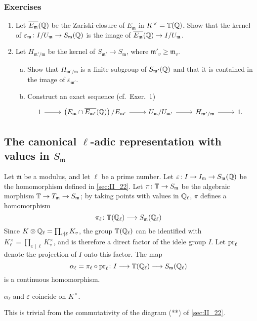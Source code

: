 \subsubsection*{Exercises}
\begin{enumerate}[1)]
\item Let $\overline{E_\mathfrak{m}}(\mathbb{Q})$ be the Zariski-closure of
	$E_{\mathfrak{m}}$ in $K^\times = \mathbb{T}(\mathbb{Q})$. Show that the kernel of
	$\varepsilon_\mathfrak{m} \colon I/U_\mathfrak{m} \to
	S_\mathfrak{m}(\mathbb{Q})$ is the image of $\overline{E_\mathfrak{m}}(\mathbb{Q}) \to
	I/U_\mathfrak{m}$.
\item Let $H_{\mathfrak{m}'/\mathfrak{m}}$ be the kernel of
	\dpage
	$S_{\mathfrak{m}'} \to S_\mathfrak{m}$, where $\mathfrak{m}'_v \geq
	\mathfrak{m}_v$.
	\begin{enumerate}[a)]
	\item Show that $H_{\mathfrak{m}'/\mathfrak{m}}$ is a finite subgroup
		of $S_{\mathfrak{m}'}(\mathbb{Q})$ and that it is contained  in the
		image of $\varepsilon_{\mathfrak{m}'}$.
	\item Construct an exact sequence (cf.\ Exer.~1)
		\[\begin{tikzcd}
		1 \arrow[r] & \left({E_\mathfrak{m} \cap
		\algcl{E_{\mathfrak{m}'}}(\Q)}\right)/ E_{\mathfrak{m}'}
				\arrow[r] & U_\mathfrak{m} / U_{\mathfrak{m}'}
				\arrow[r] & H_{\mathfrak{m}'/\mathfrak{m}}
				\arrow[r] & 1.
		\end{tikzcd}\]
	\end{enumerate}	
\end{enumerate}

\subsection{The canonical \texorpdfstring{$\ell$}{ℓ}-adic representation with
values in \texorpdfstring{$S_{\mathfrak{m}}$}{Sm}}\label{sec:II_23}
Let $\mathfrak{m}$ be a modulus, and let $\ell$ be a prime number. Let
$\varepsilon\colon I \to I_{\mathfrak{m}} \to S_{\mathfrak{m}}(\mathbb{Q})$ be the
homomorphism defined in \ref{sec:II_22}. Let $\pi\colon \mathbb{T} \to S_{\mathfrak{m}}$
be the algebraic morphism $\mathbb{T} \to T_{\mathfrak{m}} \to S_{\mathfrak{m}}$; by
taking points with values in $\mathbb{Q}_\ell$, $\pi$ defines a homomorphism
\[
	\pi_\ell \colon \mathbb{T}(\mathbb{Q}_\ell) \longrightarrow S_{\mathfrak{m}}(\mathbb{Q}_\ell)
\]
Since $K \otimes \mathbb{Q}_\ell = \prod_{v\mid\ell} K_v$, the group $\mathbb{T}(\mathbb{Q}_\ell)$ can
be identified with $K_\ell^\times = \prod_{v\mid\ell} K_v^\times$, and is
therefore a direct factor of the idele group $I$.  Let $\operatorname{pr}_\ell$ denote the
projection of $I$ onto this factor. The map
\[
	\alpha_\ell = \pi_\ell \circ \operatorname{pr}_\ell \colon I \longrightarrow \mathbb{T}(\mathbb{Q}_\ell)
	\longrightarrow S_{\mathfrak{m}}(\mathbb{Q}_\ell)
\]
is a continuous homomorphism.
\begin{lem}
	$\alpha_\ell$ and $\varepsilon$ coincide on $K^\times$.
\end{lem}
This is trivial from the commutativity of the diagram (**) of \ref{sec:II_22}.

